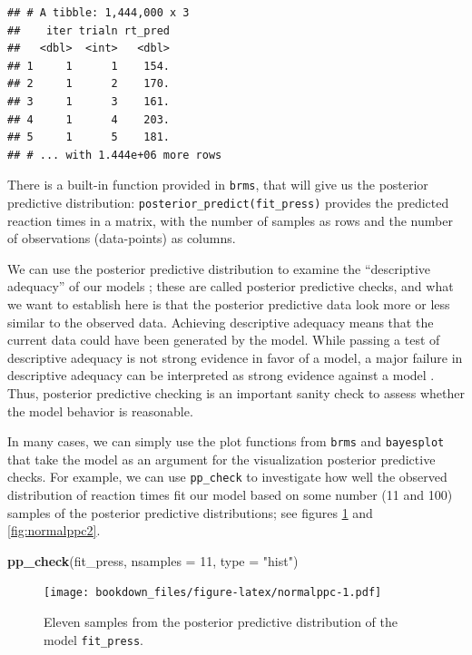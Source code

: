 \documentclass[12pt,]{krantz}
\newenvironment{Shaded}{\begin{snugshade}}{\end{snugshade}}
\newcommand{\DataTypeTok}[1]{\textcolor[rgb]{0.13,0.29,0.53}{#1}}
\newcommand{\DecValTok}[1]{\textcolor[rgb]{0.00,0.00,0.81}{#1}}
\newcommand{\KeywordTok}[1]{\textcolor[rgb]{0.13,0.29,0.53}{\textbf{#1}}}
\newcommand{\NormalTok}[1]{#1}
\newcommand{\StringTok}[1]{\textcolor[rgb]{0.31,0.60,0.02}{#1}}
\theoremstyle{definition}
\theoremstyle{definition}
\theoremstyle{definition}
\theoremstyle{remark}
\begin{document}
\begin{verbatim}
## # A tibble: 1,444,000 x 3
##    iter trialn rt_pred
##   <dbl>  <int>   <dbl>
## 1     1      1    154.
## 2     1      2    170.
## 3     1      3    161.
## 4     1      4    203.
## 5     1      5    181.
## # ... with 1.444e+06 more rows
\end{verbatim}

There is a built-in function provided in \texttt{brms}, that will give us the posterior predictive distribution: \texttt{posterior\_predict(fit\_press)} provides the predicted reaction times in a matrix, with the number of samples as rows and the number of observations (data-points) as columns.

We can use the posterior predictive distribution to examine the ``descriptive adequacy'' of our models \citetext{\citealp[Chapter 6]{Gelman14}; \citealp{shiffrinSurveyModelEvaluation2008}}; these are called posterior predictive checks, and what we want to establish here is that the posterior predictive data look more or less similar to the observed data. Achieving descriptive adequacy means that the current data could have been generated by the model. While passing a test of descriptive adequacy is not strong evidence in favor of a model, a major failure in descriptive adequacy can be interpreted as strong evidence against a model \citep{shiffrinSurveyModelEvaluation2008}. Thus, posterior predictive checking is an important sanity check to assess whether the model behavior is reasonable.

In many cases, we can simply use the plot functions from \texttt{brms} and \texttt{bayesplot} that take the model as an argument for the visualization posterior predictive checks. For example, we can use \texttt{pp\_check} to investigate how well the observed distribution of reaction times fit our model based on some number (11 and 100) samples of the posterior predictive distributions; see figures \ref{fig:normalppc} and \ref{fig:normalppc2}.



\begin{Shaded}
\begin{Highlighting}[]
\KeywordTok{pp_check}\NormalTok{(fit_press, }\DataTypeTok{nsamples =} \DecValTok{11}\NormalTok{, }\DataTypeTok{type =} \StringTok{"hist"}\NormalTok{)}
\end{Highlighting}
\end{Shaded}

\begin{figure}
\centering
\texttt{[image: bookdown\_files/figure-latex/normalppc-1.pdf]}
\caption{\label{fig:normalppc}Eleven samples from the posterior predictive distribution of the model \texttt{fit\_press}.}
\end{figure}
\end{document}
